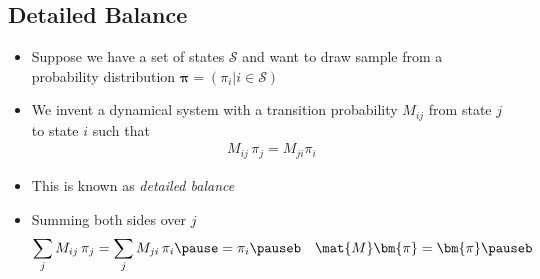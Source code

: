 \begin{slide}
\section[-1]{Detailed Balance}

\begin{PauseHighLight}
  \begin{itemize}
  \item Suppose we have a set of states $\mathcal{S}$ and want to draw
    sample from a probability distribution $\bm{\pi} = (\pi_i | i \in
    \mathcal{S})$\pause
  \item We invent a dynamical system with a transition probability $M_{ij}$ from state $j$ to
    state $i$ such that
    \begin{align*}
      M_{ij} \, \pi_j = M_{ji} \pi_i
    \end{align*}
  \item This is known as \emph{detailed balance}\pause
  \item Summing both sides over $j$
    \begin{align*}
      \sum_{j} M_{ij}\,\pi_j &= \sum_{j} M_{ji}\,\pi_i \pause = \pi_i\pauseb
      &
        \mat{M} \bm{\pi} = \bm{\pi}\pauseb
    \end{align*}
  \end{itemize}
\end{PauseHighLight}

\end{slide}


